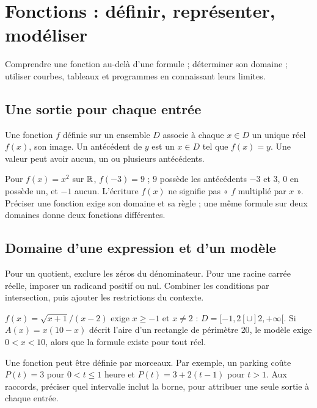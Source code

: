 \documentclass[../cours_2de.tex]{subfiles}
\begin{document}
\setcounter{chapter}{11}
\chapter{Fonctions : définir, représenter, modéliser}
\label{sec:ch12}
\begin{objectif}
Comprendre une fonction au-delà d'une formule ; déterminer son domaine ; utiliser courbes, tableaux et programmes en connaissant leurs limites.
\end{objectif}
\section{Une sortie pour chaque entrée}
\begin{definition}
Une fonction $f$ définie sur un ensemble $D$ associe à chaque $x\in D$ un unique réel $f(x)$, son image.
Un antécédent de $y$ est un $x\in D$ tel que $f(x)=y$. Une valeur peut avoir aucun, un ou plusieurs antécédents.
\end{definition}
Pour $f(x)=x^2$ sur $\mathbb{R}$, $f(-3)=9$ ; $9$ possède les antécédents $-3$ et $3$, $0$ en possède un, et $-1$ aucun.
L'écriture $f(x)$ ne signifie pas « $f$ multiplié par $x$ ».
Préciser une fonction exige son domaine et sa règle ; une même formule sur deux domaines donne deux fonctions différentes.
\section{Domaine d'une expression et d'un modèle}
\begin{methode}
Pour un quotient, exclure les zéros du dénominateur.
Pour une racine carrée réelle, imposer un radicand positif ou nul.
Combiner les conditions par intersection, puis ajouter les restrictions du contexte.
\end{methode}
\begin{exemple}
$f(x)=\sqrt{x+1}/(x-2)$ exige $x\geq-1$ et $x\ne2$ :
$D=[-1,2[\cup]2,+\infty[$.
Si $A(x)=x(10-x)$ décrit l'aire d'un rectangle de périmètre $20$, le modèle exige $0<x<10$, alors que la formule existe pour tout réel.
\end{exemple}
Une fonction peut être définie par morceaux. Par exemple, un parking coûte
$P(t)=3$ pour $0<t\leq1$ heure et $P(t)=3+2(t-1)$ pour $t>1$.
Aux raccords, préciser quel intervalle inclut la borne, pour attribuer une seule sortie à chaque entrée.
\end{document}
